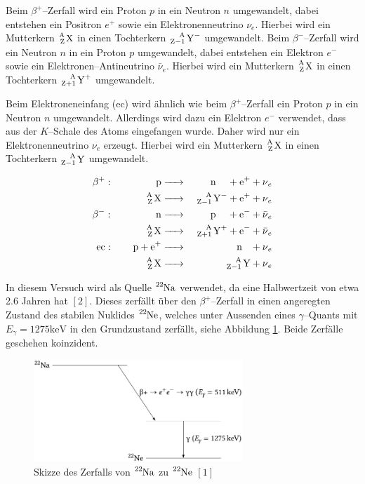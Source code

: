 \documentclass[12pt,a4paper]{scrartcl}
\numberwithin{equation}{section} %
\newcommand{\pu}[1]{\ensuremath{\mathrm{#1}}}
\begin{document}
Beim $\beta^+$--Zerfall wird ein Proton $p$ in ein Neutron $n$ umgewandelt, dabei entstehen ein Positron $e^+$ sowie ein Elektronenneutrino $\nu_e$. Hierbei wird ein Mutterkern $\ce{^A_Z X}$ in einen Tochterkern $\ce{^A_{Z-1} Y^-}$ umgewandelt. Beim $\beta^-$--Zerfall wird ein Neutron $n$ in ein Proton $p$ umgewandelt, dabei entstehen ein Elektron $e^-$ sowie ein Elektronen--Antineutrino $\bar{\nu}_e$. Hierbei wird ein Mutterkern $\ce{^A_Z X}$ in einen Tochterkern $\ce{^A_{Z+1} Y^+}$ umgewandelt.

Beim Elektroneneinfang (ec) wird ähnlich wie beim $\beta^+$--Zerfall ein Proton $p$ in ein Neutron $n$ umgewandelt. Allerdings wird dazu ein Elektron $e^-$ verwendet, dass aus der $K$--Schale des Atoms eingefangen wurde. Daher wird nur ein Elektronenneutrino $\nu_e$ erzeugt. Hierbei wird ein Mutterkern $\ce{^A_Z X}$ in einen Tochterkern $\ce{^A_{Z-1} Y}$ umgewandelt.

\begin{eqnarray}
    \beta^+:\qquad\,\,\qquad
        \ce{p} &\ce{->}& \quad \ce{n} \quad\, + \ce{e^+} + \ce{\nu_e} \\
        \ce{^A_Z X} &\ce{->}& \ce{^A_{Z-1} Y^-} + \ce{e^+} + \ce{\nu_e} \\
    \beta^-:\qquad\,\,\qquad
        \ce{n} &\ce{->}& \quad \ce{p} \quad\, + \ce{e^-} + \ce{\bar{\nu}_e} \\
        \ce{^A_Z X} &\ce{->}& \ce{^A_{Z+1} Y^+} + \ce{e^-} + \ce{\bar{\nu}_e} \\
    \text{ec}:\qquad
        \ce{p + e^+} &\ce{->}& \quad \ce{n} \ \ \, + \ce{\nu_e} \\
        \ce{^A_Z X} &\ce{->}& \ce{^A_{Z-1} Y} + \ce{\nu_e}
\end{eqnarray}

\noindent
In diesem Versuch wird als Quelle $\ce{^{22}Na}$ verwendet, da eine Halbwertzeit von etwa 2.6 Jahren hat $[2]$. Dieses zerfällt über den $\beta^+$--Zerfall in einen angeregten Zustand des stabilen Nuklides $\ce{^{22}Ne}$, welches unter Aussenden eines $\gamma$--Quants mit $E_\gamma = \pu{1275 keV}$ in den Grundzustand zerfällt, siehe Abbildung \ref{abb:Skizze 22Na}. Beide Zerfälle geschehen koinzident.

\begin{figure}[h]
	\centering
	\includegraphics[width=0.7\textwidth]{../media/B3.4/Zerfall_22_Na.pdf}
	\caption{Skizze des Zerfalls von $\ce{^{22}Na}$ zu $\ce{^{22}Ne}$ $[1]$}
	\label{abb:Skizze 22Na}
\end{figure}
\end{document}
